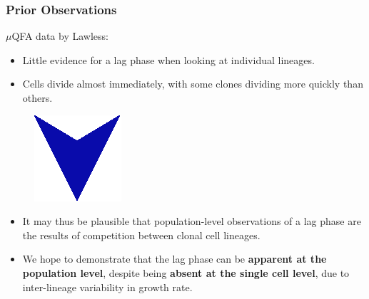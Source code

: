 \documentclass{beamer}
\begin{document}

\begin{frame}
\frametitle{Prior Observations}
\begin{block}{$\mu$QFA data by Lawless:}
\begin{itemize}
\item Little evidence for a lag phase when looking at individual lineages. 
\item Cells divide almost immediately, with some clones dividing more quickly than others. 
\end{itemize}
\end{block}
\vspace{-0.5em}
\begin{figure}
\includegraphics[width=0.07\linewidth]{BlueArrow.png}
\end{figure}
\vspace{-0.5em}
\begin{block}{}
\begin{itemize}
\item It may thus be plausible that population-level observations of a lag phase are the results of competition between clonal cell lineages. 
\item We hope to demonstrate that the lag phase can be \textbf{apparent at the population level}, despite being \textbf{absent at the single cell level}, due to inter-lineage variability in growth rate.
\end{itemize}
\end{block}
\end{frame}
\end{document}
